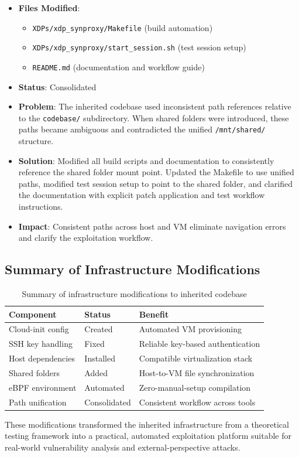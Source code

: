 \begin{itemize}
\item \textbf{Files Modified}:
\begin{itemize}
  \item \texttt{XDPs/xdp\_synproxy/Makefile} (build automation)
  \item \texttt{XDPs/xdp\_synproxy/start\_session.sh} (test session setup)
  \item \texttt{README.md} (documentation and workflow guide)
\end{itemize}

\item \textbf{Status}: Consolidated

\item \textbf{Problem}: The inherited codebase used inconsistent path references relative to the \texttt{codebase/} subdirectory. When shared folders were introduced, these paths became ambiguous and contradicted the unified \texttt{/mnt/shared/} structure.

\item \textbf{Solution}: Modified all build scripts and documentation to consistently reference the shared folder mount point. Updated the Makefile to use unified paths, modified test session setup to point to the shared folder, and clarified the documentation with explicit patch application and test workflow instructions.

\item \textbf{Impact}: Consistent paths across host and VM eliminate navigation errors and clarify the exploitation workflow.
\end{itemize}

\subsection{Summary of Infrastructure Modifications}

\begin{table}[h]
\centering
\begin{tabular}{|l|l|l|}
\hline
\textbf{Component} & \textbf{Status} & \textbf{Benefit} \\
\hline
Cloud-init config & Created & Automated VM provisioning \\
SSH key handling & Fixed & Reliable key-based authentication \\
Host dependencies & Installed & Compatible virtualization stack \\
Shared folders & Added & Host-to-VM file synchronization \\
eBPF environment & Automated & Zero-manual-setup compilation \\
Path unification & Consolidated & Consistent workflow across tools \\
\hline
\end{tabular}
\caption{Summary of infrastructure modifications to inherited codebase}
\end{table}

These modifications transformed the inherited infrastructure from a theoretical testing framework into a practical, automated exploitation platform suitable for real-world vulnerability analysis and external-perspective attacks.
